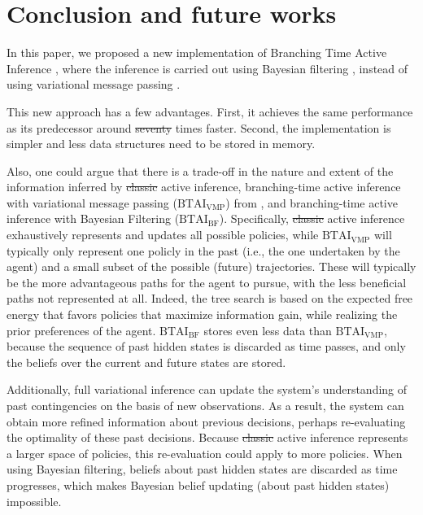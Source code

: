 \documentclass[twoside,11pt]{article}
\providecommand{\DIFadd}[1]{{\protect\color{blue}\uwave{#1}}} %
\providecommand{\DIFdel}[1]{{\protect\color{red}\sout{#1}}}                      %
\providecommand{\DIFaddbegin}{} %
\providecommand{\DIFaddend}{} %
\providecommand{\DIFdelbegin}{} %
\providecommand{\DIFdelend}{} %
\begin{document}
\DIFaddend \section{Conclusion and future works} \label{sec:conclusion}

In this paper, we proposed a new implementation of Branching Time Active Inference \citep{AITS_THEORY,AITS_PRACTICE}, where the inference is carried out using Bayesian filtering \citep{BAYESIAN_FILTERING}, instead of using variational message passing \citep{AI_VMP,VMP_TUTO}.

This new approach has a few advantages. First, it achieves the same performance as its predecessor around \DIFdelbegin \DIFdel{seventy }\DIFdelend \DIFaddbegin \DIFadd{forty }\DIFaddend times faster. Second, the implementation is simpler and less data structures need to be stored in memory.

Also, one could argue that there is a trade-off in the nature and extent of the information inferred by \DIFdelbegin \DIFdel{classic }\DIFdelend \DIFaddbegin \DIFadd{zero-tethered }\DIFaddend active inference, branching-time active inference with variational message passing ($\text{BTAI}_{\text{VMP}}$) from \citet{AITS_THEORY,AITS_PRACTICE}, and branching-time active inference with Bayesian Filtering ($\text{BTAI}_{\text{BF}}$). Specifically, \DIFdelbegin \DIFdel{classic }\DIFdelend \DIFaddbegin \DIFadd{zero-tethered }\DIFaddend active inference exhaustively represents and updates all possible policies, while $\text{BTAI}_{\text{VMP}}$ will typically only represent one policly in the past (i.e., the one undertaken by the agent) and a small subset of the possible (future) trajectories. These will typically be the more advantageous paths for the agent to pursue, with the less beneficial paths not represented at all. Indeed, the tree search is based on the expected free energy that favors policies that maximize information gain, while realizing the prior preferences of the agent. $\text{BTAI}_{\text{BF}}$ stores even less data than $\text{BTAI}_{\text{VMP}}$, because the sequence of past hidden states is discarded as time passes, and only the beliefs over the current and future states are stored.

Additionally, full variational inference can update the system's understanding of past contingencies on the basis of new observations. As a result, the system can obtain more refined information about previous decisions, perhaps re-evaluating the optimality of these past decisions. Because \DIFdelbegin \DIFdel{classic }\DIFdelend \DIFaddbegin \DIFadd{zero-tethered }\DIFaddend active inference represents a larger space of policies, this re-evaluation could apply to more policies. When using Bayesian filtering, beliefs about past hidden states are discarded as time progresses, which makes Bayesian belief updating (about past hidden states) impossible.
\end{document}
